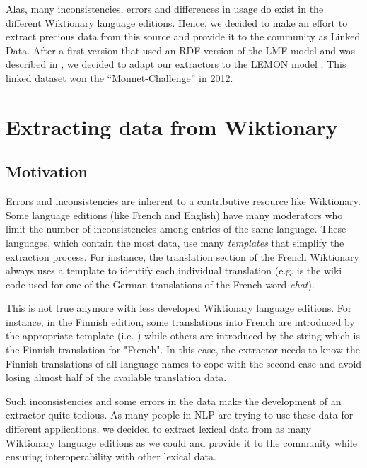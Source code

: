 \documentclass[sw]{iosart2c}
\newcommand{\ffbox}[1]{%
  {%
   \setlength{\fboxsep}{-2\fboxrule}%
   \fbox{\hspace{1.2pt}\strut#1\hspace{1.2pt}}%
  }%
}
\begin{document}
Alas, many inconsistencies, errors and differences in usage do exist in the different Wiktionary language editions. Hence, we decided to make an effort to extract precious data from this source and provide it to the community as Linked Data. After a first version that used an RDF version of the LMF model \cite{FRANCOPOULO:2006:INRIA-00121468:1,francopoulo-EtAl:2006:MLRI} and was described in \cite{serasset:lrec2012}, we decided to adapt our extractors to the LEMON model \cite{McRae-lemon:2012}. This linked dataset won the ``Monnet-Challenge'' in 2012.

\section{Extracting data from Wiktionary}

\subsection{Motivation}

Errors and inconsistencies are inherent to a contributive resource like Wiktionary. Some language editions (like French and English) have many moderators who limit the number of inconsistencies among entries of the same language. These languages, which contain the most data, use many \textit{templates} that simplify the extraction process. For instance, the translation section of the French Wiktionary always uses a template to identify each individual translation (e.g. \ffbox{\texttt{\small \{\{trad+|de|Katze\}\} ''f''}} is the wiki code used for one of the German translations of the French word \emph{chat}).

This is not true anymore with less developed Wiktionary language editions. For instance, in the Finnish edition, some translations into French are introduced by the appropriate template (i.e. \ffbox{\texttt{\small\{\{fr\}\}}}) while others are introduced by the string \ffbox{\texttt{\small ranska}} which is the Finnish translation for "French". In this case, the extractor needs to know the Finnish translations of all language names to cope with the second case and avoid losing almost half of the available translation data.

Such inconsistencies and some errors in the data make the development of an extractor quite tedious. As many people in NLP are trying to use these data for different applications, we decided to extract lexical data from as many Wiktionary language editions as we could and provide it to the community while ensuring interoperability with other lexical data.
\end{document}
